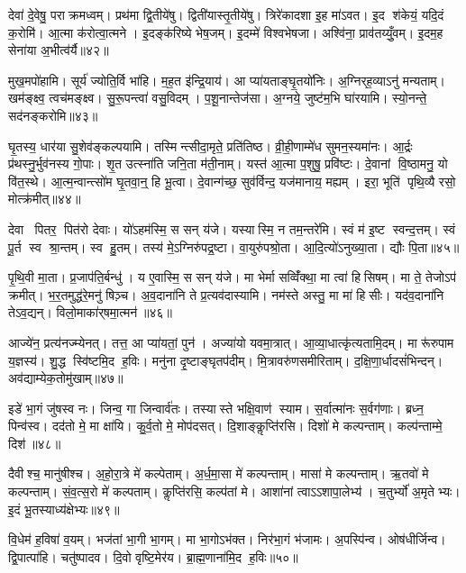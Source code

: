 देवा॑ दे॒वेषु॒ पराक्रमध्वम्। प्रथ॑मा द्वि॒तीये॑षु। द्विती॑यास्तृ॒तीये॑षु। त्रिरे॑कादशा इ॒ह मा॑ऽवत। इ॒द श॑केयं॒ यदि॒दं क॒रोमि॑। आ॒त्मा क॑रोत्वा॒त्मने। इ॒दङ्क॑रिष्ये भेष॒जम्। इ॒दम्मे॑ विश्वभेषजा। अश्वि॑ना॒ प्राव॑तय्युँ॒वम्। इ॒दम॒ह सेना॑या अ॒भीत्व॑र्यै॥४२॥

मुख॒मपो॑हामि। सूर्य॑ ज्योति॒र्वि भा॑हि। म॒ह॒त इ॑न्द्रि॒याय॑। आ प्या॑यताङ्घृ॒तयो॑निः। अ॒ग्निर्‌ह॒व्याऽनु॑ मन्यताम्। खम॑ङ्क्ष्व॒ त्वच॑मङ्क्ष्व। सु॒रू॒पन्त्वा॑ वसु॒विदम्। प॒शू॒नान्तेज॑सा। अ॒ग्नये॒ जुष्ट॑म॒भि घा॑रयामि। स्यो॒नन्ते॒ सद॑नङ्करोमि॥४३॥

घृ॒तस्य॒ धार॑या सु॒शेव॑ङ्कल्पयामि। तस्मिन्त्सीदा॒मृते॒ प्रति॑तिष्ठ। व्री॒ही॒णाम्मे॑ध सुमन॒स्यमा॑नः। आ॒र्द्रः प्र॑थस्नु॒र्भुव॑नस्य गो॒पाः। शृ॒त उत्स्ना॑ति जनि॒ता म॑ती॒नाम्। यस्त॑ आ॒त्मा प॒शुषु॒ प्रवि॑ष्टः। दे॒वानां वि॒ष्ठामनु॒ यो वि॑त॒स्थे। आ॒त्म॒न्वान्त्सो॑म घृ॒तवा॒न्॒ हि भू॒त्वा। दे॒वान्ग॑च्छ॒ सुव॑र्विन्द॒ यज॑मानाय॒ मह्यम्। इरा॒ भूति॑ पृथि॒व्यै रसो॒ मोत्क्र॑मीत्॥४४॥

देवा पितर॒ पित॑रो देवाः। यो॑ऽहम॑स्मि॒ स सन् य॑जे। यस्यास्मि॒ न तम॒न्तरे॑मि। स्वं म॑ इ॒ष्ट स्वन्द॒त्तम्। स्वं पू॒र्त स्व श्रा॒न्तम्। स्व हु॒तम्। तस्य॑ मे॒ऽग्निरु॑पद्र॒ष्टा। वा॒युरु॑पश्रो॒ता। आ॒दि॒त्यो॑ऽनुख्या॒ता। द्यौः पि॒ता॥४५॥

पृ॒थि॒वी मा॒ता। प्र॒जाप॑ति॒र्बन्धु॑। य ए॒वास्मि॒ स सन् य॑जे। मा भेर्मा सव्विँ॑क्था॒ मा त्वा॑ हिसिषम्। मा ते॒ तेजोऽप॑ क्रमीत्। भ॒र॒तमुद्ध॑रे॒मनु॑ षिञ़्च। अ॒व॒दाना॑नि ते प्र॒त्यव॑दास्यामि। नम॑स्ते अस्तु॒ मा मा॑ हिसीः। यद॑व॒दाना॑नि तेऽव॒द्यन्। विलो॒माका॑र्‌षमा॒त्मन॑॥४६॥

आज्ये॑न॒ प्रत्य॑नज्म्येनत्। तत्त॒ आ प्या॑यतां॒ पुन॑। अज्या॑यो यवमा॒त्रात्। आ॒व्या॒धात्कृ॑त्यतामि॒दम्। मा रू॑रुपाम य॒ज्ञस्य॑। शु॒द्ध स्वि॑ष्टमि॒द ह॒विः। मनु॑ना दृ॒ष्टाङ्घृतप॑दीम्। मि॒त्रावरु॑णसमीरिताम्। द॒क्षि॒णा॒र्धादसं॑भिन्दन्। अव॑द्याम्येक॒तोमु॑खाम्॥४७॥

इडे॑ भा॒गं जु॑षस्व नः। जिन्व॒ गा जिन्वार्व॑तः। तस्यास्ते भक्षि॒वाण॑ स्याम। स॒र्वात्मा॑नः स॒र्वग॑णाः। ब्रध्न॒ पिन्व॑स्व। दद॑तो मे॒ मा क्षा॑यि। कु॒र्व॒तो मे॒ मोप॑दसत्। दि॒शाङ्कॢप्ति॑रसि। दिशो॑ मे कल्पन्ताम्। कल्प॑न्ताम्मे॒ दिश॑॥४८॥

दैवीश्च॒ मानु॑षीश्च। अ॒हो॒रा॒त्रे मे॑ कल्पेताम्। अ॒र्ध॒मा॒सा मे॑ कल्पन्ताम्। मासा॑ मे कल्पन्ताम्। ऋ॒तवो॑ मे कल्पन्ताम्। सं॒व॒त्स॒रो मे॑ कल्पताम्। कॢप्ति॑रसि॒ कल्प॑तां मे। आशा॑नां त्वाऽऽशापा॒लेभ्य॑। च॒तुर्भ्यो॑ अ॒मृतेभ्यः। इ॒दं भू॒तस्याध्य॑क्षेभ्यः॥४९॥

वि॒धेम॑ ह॒विषा॑ व॒यम्। भज॑तां भा॒गी भा॒गम्। मा भा॒गोऽभ॑क्त। निर॑भा॒गं भ॑जामः। अ॒पस्पि॑न्व। ओष॑धीर्जिन्व। द्वि॒पात्पा॑हि। चतु॑ष्पादव। दि॒वो वृष्टि॒मेर॑य। ब्रा॒ह्म॒णाना॑मि॒द ह॒विः॥५०॥


